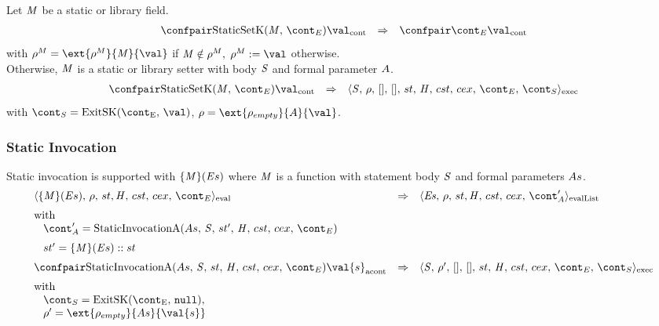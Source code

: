 \documentclass{article}
\begin{document}
Let $\mathit{M}$ be a static or library field.
\[
  \begin{array}{lcl}
	\cesktrans{
		\contconf{\StaticSetK}{\val}}{
		\contconf{\econt}{\val}}
  \end{array}
\]
with $\env^{M} = \ext{\env^{M}}{\membermeta}{\val}$ if $\mathit{M} \notin \rho^M,$ $\update{\env^{M}}{\val}$ otherwise.\\

\noindent
Otherwise, $\mathit{M}$ is a static or library setter with body $\mathit{S}$ and formal parameter $A$.
\[
  \begin{array}{lcl}
	\cesktrans{
		\contconf{\StaticSetK}{\val}}{
		\execconf{\stmt}{\env}{[]}{[]}{\handler}{\cstrace}{\cex}{\econt}{\scont}}
  \end{array}
\]
with $\scont = \ExitSK{\val}$, $\env = \ext{\env_{empty}}{\formal}{\val}$.

\subsubsection{Static Invocation}
\newcommand{\StaticInvocation}[2]{#1(#2)}
\newcommand{\StaticInvApp}[6]{\mathrm{StaticInvocationA}({#1},\,{#2},\,{#3},\,\handler,\,{#4},\,{#5},\,{#6})}
Static invocation is supported with $\StaticInvocation{\{\membermeta\}}{\expressionsmeta}$ where $\mathit{M}$ is a function with statement body $\mathit{S}$ and formal parameters $As$.
\[
  \begin{array}{lcl}
	\cesktrans{
		\evalconf{\StaticInvocation{\{\membermeta\}}{\expressionsmeta}}{\env}{\strace}{\cstrace}{\cex}{\econt}}{
		\evallistconf{\exprs}{\env}{\strace}{\cstrace}{\cex}{\acont'}}
		\\[2mm]
	\textrm{with }\\
	\hspace{3mm}\acont' = \StaticInvApp{\formals}{\stmt}{\strace'}{\cstrace}{\cex}
{\econt}\\[2mm]
	\hspace{3mm}\strace' = \StaticInvocation{\{\membermeta\}}{\expressionsmeta}::\strace\\[2mm]

	\cesktrans{
		\acontconf{\StaticInvApp{\formals}{\stmt}{\strace}{\cstrace}{\cex}
{\econt}}{\val{s}}}{
		\execconf{\stmt}{\env'}{[]}{[]}{\handler}{\cstrace}{\cex}{\econt}{\scont}}
	\\[2mm]
	\textrm{with }\\
	\hspace{3mm}\scont = \ExitSK{\tt{null}},\\
	\hspace{3mm}\env' = \ext{\env_{empty}}{\formals}{\val{s}}\\[2mm]
  \end{array}
\]
\end{document}
